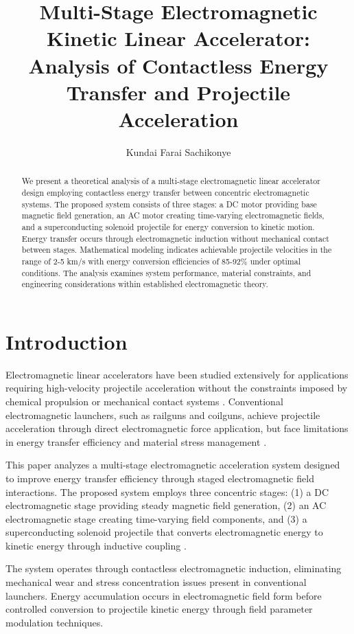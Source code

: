 \documentclass[12pt,a4paper]{article}
\title{Multi-Stage Electromagnetic Kinetic Linear Accelerator: Analysis of Contactless Energy Transfer and Projectile Acceleration}
\author{Kundai Farai Sachikonye}
\begin{document}
\maketitle

\begin{abstract}
We present a theoretical analysis of a multi-stage electromagnetic linear accelerator design employing contactless energy transfer between concentric electromagnetic systems. The proposed system consists of three stages: a DC motor providing base magnetic field generation, an AC motor creating time-varying electromagnetic fields, and a superconducting solenoid projectile for energy conversion to kinetic motion. Energy transfer occurs through electromagnetic induction without mechanical contact between stages. Mathematical modeling indicates achievable projectile velocities in the range of 2-5 km/s with energy conversion efficiencies of 85-92\% under optimal conditions. The analysis examines system performance, material constraints, and engineering considerations within established electromagnetic theory.
\end{abstract}

\section{Introduction}

Electromagnetic linear accelerators have been studied extensively for applications requiring high-velocity projectile acceleration without the constraints imposed by chemical propulsion or mechanical contact systems \cite{ref1,ref7}. Conventional electromagnetic launchers, such as railguns and coilguns, achieve projectile acceleration through direct electromagnetic force application, but face limitations in energy transfer efficiency and material stress management \cite{ref2,ref3,ref4}.

This paper analyzes a multi-stage electromagnetic acceleration system designed to improve energy transfer efficiency through staged electromagnetic field interactions. The proposed system employs three concentric stages: (1) a DC electromagnetic stage providing steady magnetic field generation, (2) an AC electromagnetic stage creating time-varying field components, and (3) a superconducting solenoid projectile that converts electromagnetic energy to kinetic energy through inductive coupling \cite{ref9}.

The system operates through contactless electromagnetic induction, eliminating mechanical wear and stress concentration issues present in conventional launchers. Energy accumulation occurs in electromagnetic field form before controlled conversion to projectile kinetic energy through field parameter modulation techniques.
\end{document}
